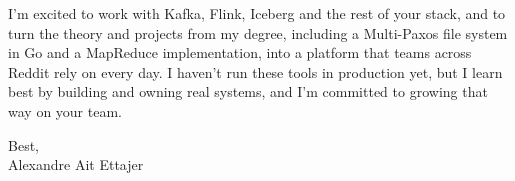 \documentclass{article}
\begin{document}
I'm excited to work with Kafka, Flink, Iceberg and the rest of your stack, and to turn the theory and projects from my degree, including a Multi-Paxos file system in Go and a MapReduce implementation, into a platform that teams across Reddit rely on every day.
I haven't run these tools in production yet, but I learn best by building and owning real systems, and I'm committed to growing that way on your team.

Best, \\
Alexandre Ait Ettajer
\end{document}
